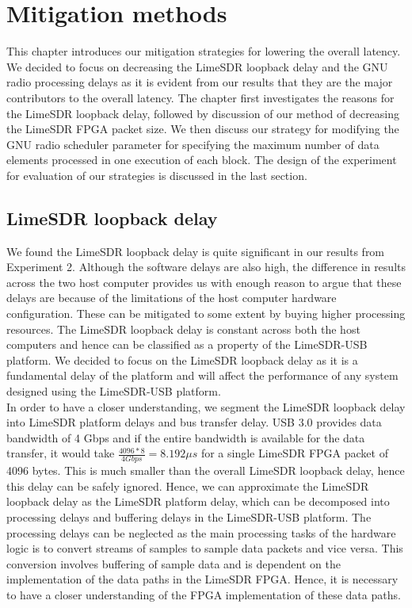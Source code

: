 \chapter{Mitigation methods}
This chapter introduces our mitigation strategies for lowering the overall latency.
We decided to focus on decreasing the LimeSDR loopback delay and the GNU radio processing delays as it is evident from our results that they are the major contributors to the overall latency.
The chapter first investigates the reasons for the LimeSDR loopback delay, followed by discussion of our method of decreasing the LimeSDR FPGA packet size.
We then discuss our strategy for modifying the GNU radio scheduler parameter for specifying the maximum number of data elements processed in one execution of each block.
The design of the experiment for evaluation of our strategies is discussed in the last section.

\section{LimeSDR loopback delay}
We found the LimeSDR loopback delay is quite significant in our results from Experiment 2.
Although the software delays are also high, the difference in results across the two host computer provides us with enough reason to argue that these delays are because of the limitations of the host computer hardware configuration.
These can be mitigated to some extent by buying higher processing resources.
The LimeSDR loopback delay is constant across both the host computers and hence can be classified as a property of the LimeSDR-USB platform.
We decided to focus on the LimeSDR loopback delay as it is a fundamental delay of the platform and will affect the performance of any system designed using the LimeSDR-USB platform.\\

In order to have a closer understanding, we segment the LimeSDR loopback delay into LimeSDR platform delays and bus transfer delay.
\ac{USB} 3.0 provides data bandwidth of 4 Gbps and if the entire bandwidth is available for the data transfer, it would take $\frac{4096*8}{4 Gbps} = 8.192 \mu s$ for a single LimeSDR FPGA packet of 4096 bytes.
This is much smaller than the overall LimeSDR loopback delay, hence this delay can be safely ignored.
Hence, we can approximate the LimeSDR loopback delay as the LimeSDR platform delay, which can be decomposed into processing delays and buffering delays in the LimeSDR-USB platform.
The processing delays can be neglected as the main processing tasks of the hardware logic is to convert streams of samples to sample data packets and vice versa.
This conversion involves buffering of sample data and is dependent on the implementation of the data paths in the LimeSDR FPGA.
Hence, it is necessary to have a closer understanding of the FPGA implementation of these data paths.\\


